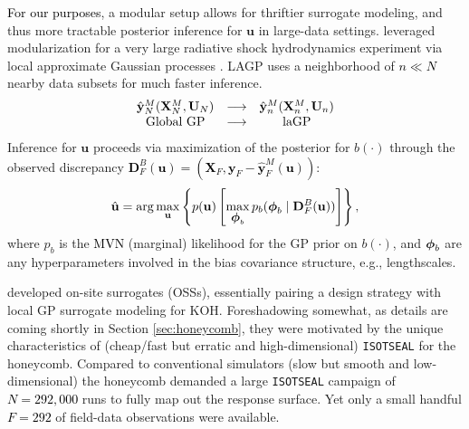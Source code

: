 \documentclass[12pt]{article}
\newcommand{\blunew}[1]{\textcolor{black}{#1}} %
\newcommand{\bm}[1]{\mbox{\boldmath $#1$}}
\begin{document}
\blunew{For our purposes}, a modular setup allows for thriftier surrogate
modeling, and thus more tractable posterior inference for $\mathbf{u}$ in
large-data settings. \cite{gra:etal:2015} leveraged modularization for a very
large radiative shock hydrodynamics experiment via local approximate Gaussian
processes \citep[LAGP;][]{gramacy:apley:2015}.  LAGP uses a neighborhood of
\blunew{$n \ll N$} nearby data subsets for much faster inference.
  \begin{align}
  \begin{array}{ccc}
 \blunew{\hat{\mathbf{y}}^M_{N} (\mathbf{X}^M_{N}, \mathbf{U}_{N}) } &
\longrightarrow  &
\blunew{\hat{\mathbf{y}}^M_{n}  (\mathbf{X}^M_{n}, \mathbf{U}_{n}) }\\
  \text{Global GP} &
\longrightarrow  &
\text{laGP}    
\label{eq:lagp}
  \end{array}
\end{align} 
Inference for $\mathbf{u}$ proceeds
via maximization of the posterior for $b(\cdot)$
 through the observed discrepancy 
\blunew{$\mathbf{D}^{B}_{F}(\mathbf{u}) =( \mathbf{X}_{F},  
 \mathbf{y}_{F} - \hat{\mathbf{y}}^M_{F}({\mathbf{u}}))$}: 
\begin{equation}
\hat{\mathbf{u}} = \mathrm{arg}\max_\mathbf{u} \left\{ p(\mathbf{u}) \left[ \max_{\bm{\phi}_b} 
p_b(\bm{\phi}_b \mid \mathbf{D}^{B}_{\blunew{F}}(\mathbf{u}))\right] \right\},
\label{eq:opt1}
\end{equation}
where $p_b$ is the \blunew{MVN} (marginal) likelihood for the GP prior on
$b(\cdot)$, and $\bm{\phi}_b$ are any hyperparameters  involved in
the bias covariance structure, e.g., lengthscales.

\cite{Huang:2018} developed on-site surrogates (OSSs), essentially
pairing a design strategy with local GP surrogate modeling for KOH.
Foreshadowing somewhat, as details are coming shortly in Section
\ref{sec:honeycomb}, they were motivated by the unique characteristics of
(cheap/fast but erratic and high-dimensional) {\tt ISOTSEAL} for the
honeycomb. Compared to conventional simulators (slow but smooth and
low-dimensional) the honeycomb demanded a large {\tt ISOTSEAL} campaign of
\blunew{$N = 292{,}000$} runs to fully map out the response surface. Yet only a small
handful \blunew{$F = 292$} of field-data observations were available.
\end{document}
